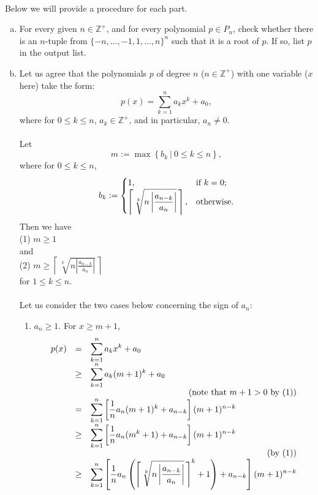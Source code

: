 \begin{enumerate}[1.]
\ \\
Below we will provide a procedure for each part.
\begin{enumerate}[(a)]
\item For every given $n \in \mathbb{Z}^+$, and for every polynomial $p \in P_n$, check whether there is an $n$-tuple from $\{-n, \ldots, -1, 1, \ldots, n\}^n$ such that it is a root of $p$. If so, list $p$ in the output list.
\item Let us agree that the polynomials $p$ of degree $n$ ($n \in \mathbb{Z}^+$) with one variable ($x$ here) take the form:
\[
p(x) = \sum_{k = 1}^n a_k x^k + a_0,
\]
where for $0 \leq k \leq n$, $a_k \in \mathbb{Z}^+$, and in particular, $a_n \neq 0$.\\
\ \\
Let
\[
m := \max \left\{ b_k \ \left| \  0 \leq k \leq n \right\}\right.,
\]
where for $0 \leq k \leq n$,
\[
b_k := \begin{cases}
1, & \mbox{if \(k = 0\)}; \cr
\left\lceil \,\sqrt[k]{ n \left| \displaystyle\frac{a_{n - k}}{a_n} \right| }\, \right\rceil, & \mbox{otherwise}.
\end{cases}
\]
Then we have\\
(1) \hfill $m \geq 1$ \hfill \phantom{(1)}\\
and\\
(2) \hfill $\displaystyle m \geq \left\lceil \,\sqrt[k]{ n \left| \displaystyle\frac{a_{n - k}}{a_n} \right| }\, \right\rceil$ \hfill \ \phantom{(2)}\\
for $1 \leq k \leq n$.\\
\ \\
Let us consider the two cases below concerning the sign of $a_n$:
\begin{enumerate}[1)]
\item $a_n \geq 1$. For $x \geq m + 1$,
\[
\begin{array}{lll}
p(x) & = & \displaystyle\sum_{k = 1}^n a_k x^k + a_0 \cr
\    & \geq & \displaystyle\sum_{k = 1}^n a_k (m + 1)^k + a_0 \cr
\multicolumn{3}{r}{\mbox{(note that $m + 1 > 0$ by (1))}} \cr
\    & = & \displaystyle\sum_{k = 1}^n \left[ \displaystyle\frac{1}{n} a_n (m + 1)^k + a_{n - k} \right] (m + 1)^{n - k} \cr
\    & \geq & \displaystyle\sum_{k = 1}^n \left[ \displaystyle\frac{1}{n} a_n (m^k + 1) + a_{n - k} \right] (m + 1)^{n - k} \cr
\multicolumn{3}{r}{\mbox{(by (1))}} \cr
\    & \geq & \displaystyle\sum_{k = 1}^n \left[ \displaystyle\frac{1}{n} a_n \left(\left\lceil \,\sqrt[k]{ n \left| \displaystyle\frac{a_{n - k}}{a_n} \right| }\, \right\rceil^k + 1\right) + a_{n - k} \right] (m + 1)^{n - k} \cr

\end{array}\]
\end{enumerate}
\end{enumerate}
\end{enumerate}
